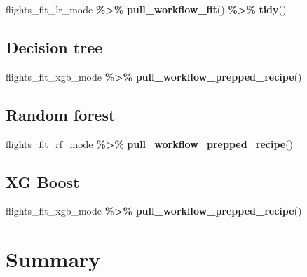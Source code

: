 \documentclass[
]{book}
\newenvironment{Shaded}{\begin{snugshade}}{\end{snugshade}}
\newcommand{\KeywordTok}[1]{\textcolor[rgb]{0.13,0.29,0.53}{\textbf{#1}}}
\newcommand{\NormalTok}[1]{#1}
\newcommand{\OperatorTok}[1]{\textcolor[rgb]{0.81,0.36,0.00}{\textbf{#1}}}
\newcommand{\StringTok}[1]{\textcolor[rgb]{0.31,0.60,0.02}{#1}}
\begin{document}
\begin{Shaded}
\begin{Highlighting}[]
\NormalTok{flights\_fit\_lr\_mode }\OperatorTok{\%\textgreater{}\%}
\StringTok{  }\KeywordTok{pull\_workflow\_fit}\NormalTok{() }\OperatorTok{\%\textgreater{}\%}
\StringTok{  }\KeywordTok{tidy}\NormalTok{()}
\end{Highlighting}
\end{Shaded}

\hypertarget{decision-tree-3}{%
\subsection{Decision tree}\label{decision-tree-3}}

\begin{Shaded}
\begin{Highlighting}[]
\NormalTok{flights\_fit\_xgb\_mode }\OperatorTok{\%\textgreater{}\%}
\StringTok{  }\KeywordTok{pull\_workflow\_prepped\_recipe}\NormalTok{()}
\end{Highlighting}
\end{Shaded}

\hypertarget{random-forest-3}{%
\subsection{Random forest}\label{random-forest-3}}

\begin{Shaded}
\begin{Highlighting}[]
\NormalTok{flights\_fit\_rf\_mode }\OperatorTok{\%\textgreater{}\%}
\StringTok{  }\KeywordTok{pull\_workflow\_prepped\_recipe}\NormalTok{()}
\end{Highlighting}
\end{Shaded}

\hypertarget{xg-boost-1}{%
\subsection{XG Boost}\label{xg-boost-1}}

\begin{Shaded}
\begin{Highlighting}[]
\NormalTok{flights\_fit\_xgb\_mode }\OperatorTok{\%\textgreater{}\%}
\StringTok{  }\KeywordTok{pull\_workflow\_prepped\_recipe}\NormalTok{()}
\end{Highlighting}
\end{Shaded}

\hypertarget{summary}{%
\section{Summary}\label{summary}}
\end{document}
